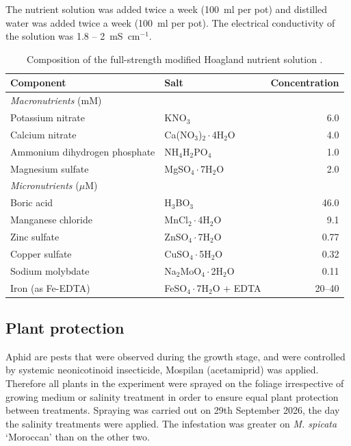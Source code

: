 The nutrient solution was added twice a week (100~ml per pot) and distilled water was added twice a week (100~ml per pot). The electrical conductivity of the solution was 1.8 – 2~mS~cm$^{-1}$.

\begin{table}[htbp]
  \centering
  \caption[Composition of the modified Hoagland nutrient solution]{Composition of the full-strength modified Hoagland nutrient solution \parencite{Hoagland1950}.}
  \label{tab:hoagland}
  \begin{tabular}{llr}
    \toprule
    Component & Salt & Concentration \\
    \midrule
    \multicolumn{3}{l}{\textit{Macronutrients} (mM)} \\
    Potassium nitrate             & KNO$_3$                      & 6.0 \\
    Calcium nitrate               & Ca(NO$_3$)$_2\cdot$4H$_2$O   & 4.0 \\
    Ammonium dihydrogen phosphate & NH$_4$H$_2$PO$_4$            & 1.0 \\
    Magnesium sulfate             & MgSO$_4\cdot$7H$_2$O         & 2.0 \\
    \midrule
    \multicolumn{3}{l}{\textit{Micronutrients} ($\mu$M)} \\
    Boric acid                    & H$_3$BO$_3$                  & 46.0 \\
    Manganese chloride            & MnCl$_2\cdot$4H$_2$O         & 9.1 \\
    Zinc sulfate                  & ZnSO$_4\cdot$7H$_2$O         & 0.77 \\
    Copper sulfate                & CuSO$_4\cdot$5H$_2$O         & 0.32 \\
    Sodium molybdate              & Na$_2$MoO$_4\cdot$2H$_2$O    & 0.11 \\
    Iron (as Fe-EDTA)             & FeSO$_4\cdot$7H$_2$O + EDTA  & 20--40 \\
    \bottomrule
  \end{tabular}
\end{table}

\subsection{Plant protection}

Aphid are pests that were observed during the growth stage, and were controlled by systemic neonicotinoid insecticide, Mospilan (acetamiprid) was applied. Therefore all plants in the experiment were sprayed on the foliage irrespective of growing medium or salinity treatment in order to ensure equal plant protection between treatments. Spraying was carried out on 29th September 2026, the day the salinity treatments were applied. The infestation was greater on \textit{M. spicata} `Moroccan' than on the other two.


